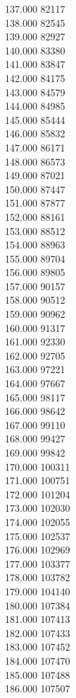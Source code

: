 { 137.000	82117 \\
 138.000	82545 \\
 139.000	82927 \\
 140.000	83380 \\
 141.000	83847 \\
 142.000	84175 \\
 143.000	84579 \\
 144.000	84985 \\
 145.000	85444 \\
 146.000	85832 \\
 147.000	86171 \\
 148.000	86573 \\
 149.000	87021 \\
 150.000	87447 \\
 151.000	87877 \\
 152.000	88161 \\
 153.000	88512 \\
 154.000	88963 \\
 155.000	89704 \\
 156.000	89805 \\
 157.000	90157 \\
 158.000	90512 \\
 159.000	90962 \\
 160.000	91317 \\
 161.000	92330 \\
 162.000	92705 \\
 163.000	97221 \\
 164.000	97667 \\
 165.000	98117 \\
 166.000	98642 \\
 167.000	99110 \\
 168.000	99427 \\
 169.000	99842 \\
 170.000	100311 \\
 171.000	100751 \\
 172.000	101204 \\
 173.000	102030 \\
 174.000	102055 \\
 175.000	102537 \\
 176.000	102969 \\
 177.000	103377 \\
 178.000	103782 \\
 179.000	104140 \\
 180.000	107384 \\
 181.000	107413 \\
 182.000	107433 \\
 183.000	107452 \\
 184.000	107470 \\
 185.000	107488 \\
 186.000	107507 \\
}
